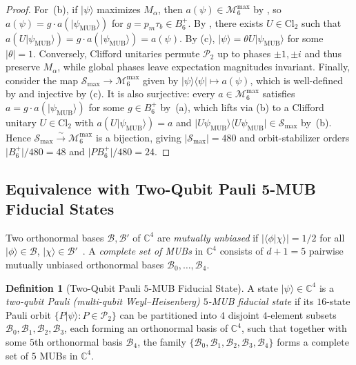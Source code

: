 \documentclass[11pt,a4paper]{article}
\theoremstyle{plain}
\theoremstyle{definition}
\newtheorem{definition}[theorem]{Definition}
\theoremstyle{remark}
\newcommand{\C}{\mathbb{C}}
\newcommand{\ket}[1]{\lvert #1 \rangle}
\newcommand{\braket}[2]{\langle #1 \vert #2 \rangle}
\newcommand{\ketbra}[2]{\lvert #1 \rangle\langle #2 \rvert}
\newcommand{\Cl}{\mathrm{Cl}}
\newcommand{\Pauli}{\mathcal{P}}
\newcommand{\Mman}{\mathcal{M}_6}
\newcommand{\Bplus}{B_6^+}
\newcommand{\PBplus}{PB_6^+}
\newcommand{\psimub}{\ket{\psi_{\mathrm{MUB}}}}
\begin{document}
\begin{proof}
For~(b), if $\ket{\psi}$ maximizes $M_\alpha$, then $a(\psi) \in \Mman^{\max}$ by , so $a(\psi) = g \cdot a(\psimub)$ for $g = p_m \tau_b \in \Bplus$. By , there exists $U \in \Cl_2$ such that $a(U\psimub) = g \cdot a(\psimub) = a(\psi)$. By (c), $\ket{\psi} = \theta U \psimub$ for some $\lvert\theta\rvert = 1$. Conversely, Clifford unitaries permute $\Pauli_2$ up to phases $\pm 1, \pm i$ and thus preserve $M_\alpha$, while global phases leave expectation magnitudes invariant. Finally, consider the map $\mathcal{S}_{\max} \to \Mman^{\max}$ given by $\ketbra{\psi}{\psi} \mapsto a(\psi)$, which is well-defined by  and injective by (c). It is also surjective: every $a \in \Mman^{\max}$ satisfies $a = g \cdot a(\psimub)$ for some $g \in \Bplus$ by~(a), which lifts via (b) to a Clifford unitary $U \in \Cl_2$ with $a(U\psimub) = a$ and $\ketbra{U\psi_{\mathrm{MUB}}}{U\psi_{\mathrm{MUB}}} \in \mathcal{S}_{\max}$ by~(b). Hence $\mathcal{S}_{\max} \xrightarrow{\sim} \Mman^{\max}$ is a bijection, giving $\lvert\mathcal{S}_{\max}\rvert = 480$ and orbit-stabilizer orders $\lvert\Bplus\rvert/480 = 48$ and $\lvert\PBplus\rvert/480 = 24$.
\end{proof}

\subsection{Equivalence with Two-Qubit Pauli 5-MUB Fiducial States}

Two orthonormal bases $\mathcal{B}, \mathcal{B}'$ of $\C^4$ are \emph{mutually unbiased} if $\lvert\braket{\phi}{\chi}\rvert = 1/2$ for all $\ket{\phi}\in\mathcal{B}$, $\ket{\chi}\in\mathcal{B}'$~\cite{WoottersFields1989,Bandyopadhyay2002}. A \emph{complete set of MUBs} in $\C^4$ consists of $d+1 = 5$ pairwise mutually unbiased orthonormal bases $\mathcal{B}_0, \dots, \mathcal{B}_4$.

\begin{definition}[Two-Qubit Pauli $5$-MUB Fiducial State]
\label{def:mub-fiducial}
A state $\ket{\psi} \in \C^4$ is a \emph{two-qubit Pauli (multi-qubit Weyl--Heisenberg) $5$-MUB fiducial state} if its $16$-state Pauli orbit $\{P\ket{\psi} : P \in \Pauli_2\}$ can be partitioned into $4$ disjoint $4$-element subsets $\mathcal{B}_0, \mathcal{B}_1, \mathcal{B}_2, \mathcal{B}_3$, each forming an orthonormal basis of $\C^4$, such that together with some $5$th orthonormal basis $\mathcal{B}_4$, the family $\{\mathcal{B}_0, \mathcal{B}_1, \mathcal{B}_2, \mathcal{B}_3, \mathcal{B}_4\}$ forms a complete set of $5$ MUBs in $\C^4$.
\end{definition}
\end{document}
